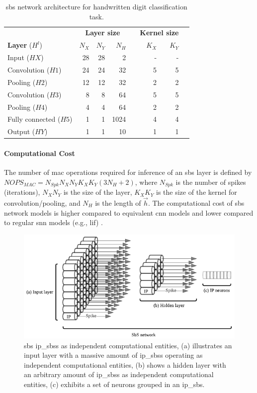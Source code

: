 \begin{table}\centering
	\caption{\gls{sbs} network architecture for handwritten digit classification task.}
	\label{tab:sbs_network}
	\scriptsize
	\begin{tabular}{lrrrrrrr}\toprule
		&\multicolumn{3}{c}{\textbf{Layer size}} & &\multicolumn{2}{c}{\textbf{Kernel size}} \\\cmidrule{2-4}\cmidrule{6-7}
		\textbf{Layer} ($H^l$) &$N_X$ &$N_Y$ &$N_H$ & &$K_X$ &$K_Y$ \\\midrule
		Input ($HX$) &28 &28 &2 & &- &- \\
		Convolution ($H1$) &24 &24 &32 & &5 &5 \\
		Pooling ($H2$) &12 &12 &32 & &2 &2 \\
		Convolution ($H3$) &8 &8 &64 & &5 &5 \\
		Pooling ($H4$) &4 &4 &64 & &2 &2 \\
		Fully connected ($H5$) &1 &1 &1024 & &4 &4 \\
		Output ($HY$) &1 &1 &10 & &1 &1 \\
		\bottomrule
	\end{tabular}
\end{table}

\paragraph{Computational Cost}

The number of \gls{mac} operations required for inference of an \gls{sbs} layer is defined by $NOPS_{MAC}=N_{Spk} N_X N_Y K_X K_Y (3 N_H + 2)$, where $N_{Spk}$ is the number of spikes (iterations), $N_X N_Y$ is the size of the layer, $K_X K_Y$ is the size of the kernel for convolution/pooling, and $N_H$ is the length of $\vec{h}$. The computational cost of \gls{sbs} network models is higher compared to equivalent \gls{cnn} models and lower compared to regular \gls{snn} models (e.g., \gls{lif}) \mbox{\cite{izhikevich2004model}}.


\begin{figure}
	\centering
	\includegraphics[width=0.5\columnwidth]{./chapters/sbs_accelerator/figures/SbS_layer.pdf}
	\caption{\gls{sbs} \glspl{ip_sbs} as independent computational entities, (a) illustrates an input layer with a massive amount of \glspl{ip_sbs} operating as independent computational entities, (b) shows a hidden layer with an arbitrary amount of \glspl{ip_sbs} as independent computational entities, (c) exhibits a set of neurons grouped in an \gls{ip_sbs}.}
	\label{fig:SbS_layer}
\end{figure}


